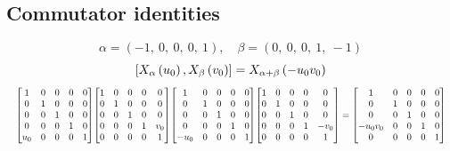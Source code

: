 \documentclass[11pt]{article}
\theoremstyle{definition}
\begin{document}
\def\arraystretch{1}

\subsection{Commutator identities}

\providecommand{\scaletoalign}[2]{%
  \sbox0{$#2$}%
  \ifdim\wd0>#1\relax 
    \resizebox{#1}{!}{\usebox0}%
  \else 
    \usebox0%
  \fi 
}
\[
\alpha = \left( -1, \  0, \  0, \  0, \  1\right), \quad \beta = \left( 0, \  0, \  0, \  1, \  -1\right)
\]
\[
\scaletoalign{\textwidth}{\left[ X_{\alpha}\left(u_{0}\right), X_{\beta}\left(v_{0}\right) \right] = X_{\alpha + \beta}\left(- u_{0} v_{0}\right)}
\]
\[
\scaletoalign{\textwidth}{{\left[\begin{matrix}1 & 0 & 0 & 0 & 0\\0 & 1 & 0 & 0 & 0\\0 & 0 & 1 & 0 & 0\\0 & 0 & 0 & 1 & 0\\u_{0} & 0 & 0 & 0 & 1\end{matrix}\right]} {\left[\begin{matrix}1 & 0 & 0 & 0 & 0\\0 & 1 & 0 & 0 & 0\\0 & 0 & 1 & 0 & 0\\0 & 0 & 0 & 1 & v_{0}\\0 & 0 & 0 & 0 & 1\end{matrix}\right]} {\left[\begin{matrix}1 & 0 & 0 & 0 & 0\\0 & 1 & 0 & 0 & 0\\0 & 0 & 1 & 0 & 0\\0 & 0 & 0 & 1 & 0\\- u_{0} & 0 & 0 & 0 & 1\end{matrix}\right]} {\left[\begin{matrix}1 & 0 & 0 & 0 & 0\\0 & 1 & 0 & 0 & 0\\0 & 0 & 1 & 0 & 0\\0 & 0 & 0 & 1 & - v_{0}\\0 & 0 & 0 & 0 & 1\end{matrix}\right]} = {\left[\begin{matrix}1 & 0 & 0 & 0 & 0\\0 & 1 & 0 & 0 & 0\\0 & 0 & 1 & 0 & 0\\- u_{0} v_{0} & 0 & 0 & 1 & 0\\0 & 0 & 0 & 0 & 1\end{matrix}\right]}}
\]
\end{document}
